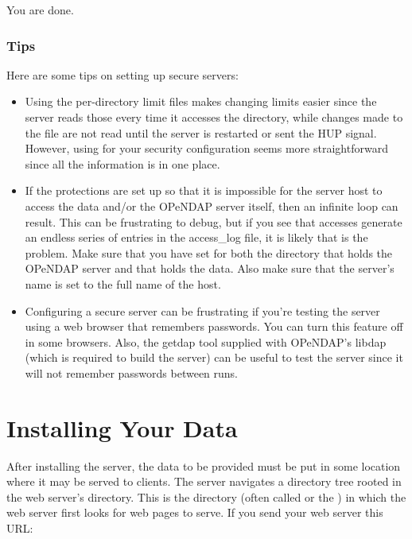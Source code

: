 \documentclass{dods-book}
\begin{document}
You are done.

\subsection{Tips}

Here are some tips on setting up secure servers:

\begin{itemize}
\item Using the per-directory limit files makes changing limits easier
  since the server reads those every time it accesses the directory,
  while changes made to the  file are not read until
  the server is restarted or sent the HUP signal. However, using
   for your security configuration seems more
  straightforward since all the information is in one place.

\item If the protections are set up so that it is impossible for the
  server host to access the data and/or the OPeNDAP server itself,
  then an infinite loop can result. This can be frustrating to debug,
  but if you see that accesses generate an endless series of entries
  in the access_log file, it is likely that is the problem. Make sure
  that you have  set for both the
  directory that holds the OPeNDAP server and that holds the data.
  Also make sure that the server's name is set to the full name of the
  host.

\item Configuring a secure server can be frustrating if you're testing
  the server using a web browser that remembers passwords. You can
  turn this feature off in some browsers. Also, the getdap tool
  supplied with OPeNDAP's libdap (which is required to build the
  server) can be useful to test the server since it will not remember
  passwords between runs.
\end{itemize}



\chapter{Installing Your Data}
\label{install,data-install}

After installing the server, the data to be provided must be put in
some location where it may be served to clients. The server navigates
a directory tree rooted in the web  server's 
directory. This is the directory (often called  or the
) in which the web server first looks for web pages
to serve. If you send your web server this URL:
\end{document}
